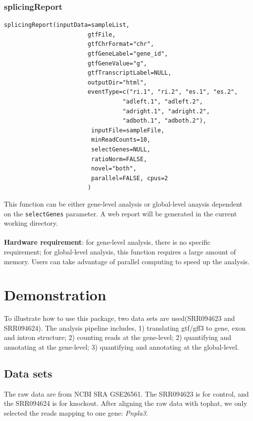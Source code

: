 \documentclass[a4paper]{article}
\begin{document}
\subsubsection{splicingReport}
\begin{verbatim}
splicingReport(inputData=sampleList, 
                        gtfFile, 
                        gtfChrFormat="chr", 
                        gtfGeneLabel="gene_id", 
                        gtfGeneValue="g",
                        gtfTranscriptLabel=NULL,
                        outputDir="html", 
                        eventType=c("ri.1", "ri.2", "es.1", "es.2", 
                                  "adleft.1", "adleft.2", 
                                  "adright.1", "adright.2",
                                  "adboth.1", "adboth.2"),
                         inputFile=sampleFile,
                         minReadCounts=10,                     
                         selectGenes=NULL, 
                         ratioNorm=FALSE, 
                         novel="both", 
                         parallel=FALSE, cpus=2
                        )
\end{verbatim}
This function can be either gene-level analysis or global-level anaysis dependent on the \texttt{selectGenes} parameter.
A web report will be generated in the current working directory. 
\\ \\
\textbf{Hardware requirement}: for gene-level analysis, there is no specific requirement;
for global-level analysis, this function requires a large amount of memory. Users can 
take advantage of parallel computing to speed up the analysis.

\section{Demonstration}
To illustrate how to use this package, two data sets are 
used(SRR094623 and SRR094624). The analysis pipeline includes,
1) translating gtf/gff3 to gene, exon and intron structure;
2) counting reads at the gene-level;
2) quantifying and annotating at the gene-level;
3) quantifying and annotating at the global-level.
\subsection{Data sets}
The raw data are from NCBI SRA GSE26561.
The SRR094623 is for control, and the SRR094624 is for knockout. After aligning
the raw data with tophat, we only selected the reads mapping to one gene: \emph{Pnpla3}.
\end{document}
